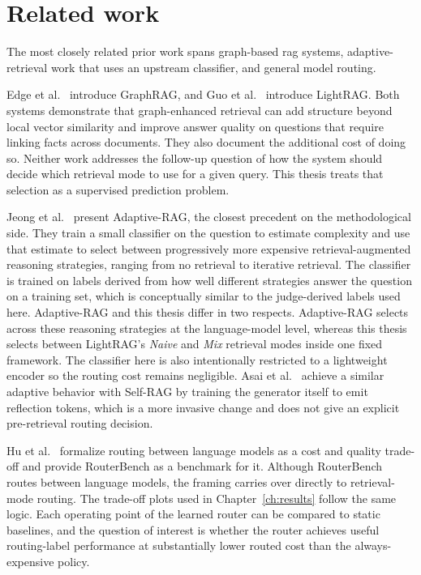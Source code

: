 \documentclass[english, bibtex]{kththesis}               %
\numberwithin{listing}{chapter}
\begin{document}
\section{Related work}
\label{sec:relatedWork}

The most closely related prior work spans graph-based \gls{rag} systems, adaptive-retrieval work that uses an upstream classifier, and general model routing.

Edge et al.\ \cite{edge2024graphrag} introduce GraphRAG, and Guo et al.\ \cite{lightrag2024} introduce LightRAG. Both systems demonstrate that graph-enhanced retrieval can add structure beyond local vector similarity and improve answer quality on questions that require linking facts across documents. They also document the additional cost of doing so. Neither work addresses the follow-up question of how the system should decide which retrieval mode to use for a given query. This thesis treats that selection as a supervised prediction problem.

Jeong et al.\ \cite{jeong2024adaptiverag} present Adaptive-RAG, the closest precedent on the methodological side. They train a small classifier on the question to estimate complexity and use that estimate to select between progressively more expensive retrieval-augmented reasoning strategies, ranging from no retrieval to iterative retrieval. The classifier is trained on labels derived from how well different strategies answer the question on a training set, which is conceptually similar to the judge-derived labels used here. Adaptive-RAG and this thesis differ in two respects. Adaptive-RAG selects across these reasoning strategies at the language-model level, whereas this thesis selects between LightRAG's \emph{Naive} and \emph{Mix} retrieval modes inside one fixed framework. The classifier here is also intentionally restricted to a lightweight encoder so the routing cost remains negligible. Asai et al.\ \cite{asai2023selfrag} achieve a similar adaptive behavior with Self-RAG by training the generator itself to emit reflection tokens, which is a more invasive change and does not give an explicit pre-retrieval routing decision.

Hu et al.\ \cite{hu2024routerbench} formalize routing between language models as a cost and quality trade-off and provide RouterBench as a benchmark for it. Although RouterBench routes between language models, the framing carries over directly to retrieval-mode routing. The trade-off plots used in Chapter~\ref{ch:results} follow the same logic. Each operating point of the learned router can be compared to static baselines, and the question of interest is whether the router achieves useful routing-label performance at substantially lower routed cost than the always-expensive policy.
\end{document}
